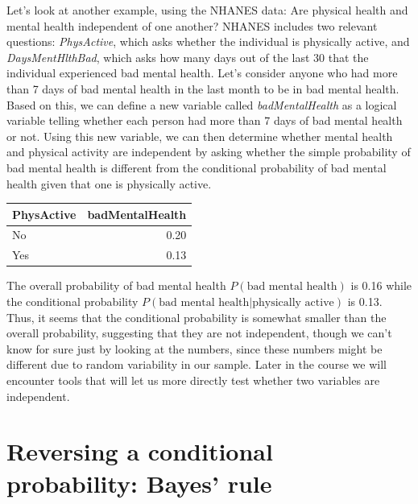 \documentclass[12pt,]{book}
\theoremstyle{definition}
\theoremstyle{definition}
\theoremstyle{definition}
\theoremstyle{remark}
\begin{document}
Let's look at another example, using the NHANES data: Are physical health and mental health independent of one another? NHANES includes two relevant questions: \emph{PhysActive}, which asks whether the individual is physically active, and \emph{DaysMentHlthBad}, which asks how many days out of the last 30 that the individual experienced bad mental health. Let's consider anyone who had more than 7 days of bad mental health in the last month to be in bad mental health. Based on this, we can define a new variable called \emph{badMentalHealth} as a logical variable telling whether each person had more than 7 days of bad mental health or not. Using this new variable, we can then determine whether mental health and physical activity are independent by asking whether the simple probability of bad mental health is different from the conditional probability of bad mental health given that one is physically active.

\begin{tabular}{l|r}
\hline
PhysActive & badMentalHealth\\
\hline
No & 0.20\\
\hline
Yes & 0.13\\
\hline
\end{tabular}

The overall probability of bad mental health \(P(\text{bad mental health})\) is 0.16 while the conditional probability \(P(\text{bad mental health|physically active})\) is 0.13. Thus, it seems that the conditional probability is somewhat smaller than the overall probability, suggesting that they are not independent, though we can't know for sure just by looking at the numbers, since these numbers might be different due to random variability in our sample. Later in the course we will encounter tools that will let us more directly test whether two variables are independent.

\hypertarget{bayestheorem}{%
\section{Reversing a conditional probability: Bayes' rule}\label{bayestheorem}}
\end{document}
